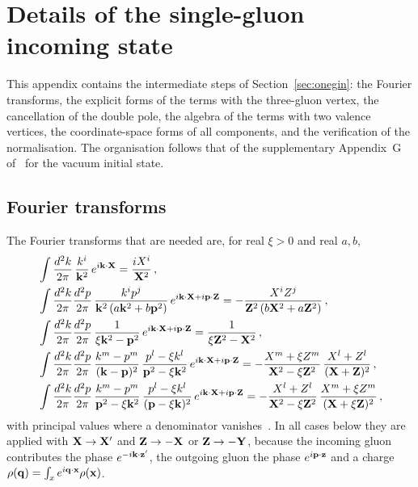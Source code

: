 \section{Details of the single-gluon incoming state}\label{app:onegluon}

This appendix contains the intermediate steps of Section~\ref{sec:onegin}: the Fourier transforms, the explicit forms of the terms with the three-gluon vertex, the cancellation of the double pole, the algebra of the terms with two valence vertices, the coordinate-space forms of all components, and the verification of the normalisation. The organisation follows that of the supplementary Appendix~G of~\cite{Lublinsky:2016meo} for the vacuum initial state.

\subsection{Fourier transforms}\label{app:fourier}

The Fourier transforms that are needed are, for real $\xi>0$ and real $a,b$,
\begin{align}
&\int\frac{d^2k}{2\pi}\,\frac{k^i}{\mathbf{k}^2}\,e^{i\mathbf{k}\cdot\mathbf{X}}=\frac{iX^i}{\mathbf{X}^2}\,,\label{eq:FT_K}\\
&\int\frac{d^2k}{2\pi}\frac{d^2p}{2\pi}\,\frac{k^ip^j}{\mathbf{k}^2\,(a\mathbf{k}^2+b\mathbf{p}^2)}\,e^{i\mathbf{k}\cdot\mathbf{X}+i\mathbf{p}\cdot\mathbf{Z}}=-\frac{X^iZ^j}{\mathbf{Z}^2\,(b\mathbf{X}^2+a\mathbf{Z}^2)}\,,\label{eq:FT_i2}\\
&\int\frac{d^2k}{2\pi}\frac{d^2p}{2\pi}\,\frac{1}{\xi\mathbf{k}^2-\mathbf{p}^2}\,e^{i\mathbf{k}\cdot\mathbf{X}+i\mathbf{p}\cdot\mathbf{Z}}=\frac{1}{\xi\mathbf{Z}^2-\mathbf{X}^2}\,,\label{eq:FT_i3}\\
&\int\frac{d^2k}{2\pi}\frac{d^2p}{2\pi}\,\frac{k^m-p^m}{(\mathbf{k}-\mathbf{p})^2}\,\frac{p^l-\xi k^l}{\mathbf{p}^2-\xi\mathbf{k}^2}\,e^{i\mathbf{k}\cdot\mathbf{X}+i\mathbf{p}\cdot\mathbf{Z}}=-\frac{X^m+\xi Z^m}{\mathbf{X}^2-\xi\mathbf{Z}^2}\,\frac{X^l+Z^l}{(\mathbf{X}+\mathbf{Z})^2}\,,\label{eq:FT_i4}\\
&\int\frac{d^2k}{2\pi}\frac{d^2p}{2\pi}\,\frac{k^m-p^m}{\mathbf{p}^2-\xi\mathbf{k}^2}\,\frac{p^l-\xi k^l}{(\mathbf{p}-\xi\mathbf{k})^2}\,e^{i\mathbf{k}\cdot\mathbf{X}+i\mathbf{p}\cdot\mathbf{Z}}=-\frac{X^l+Z^l}{\mathbf{X}^2-\xi\mathbf{Z}^2}\,\frac{X^m+\xi Z^m}{(\mathbf{X}+\xi\mathbf{Z})^2}\,,\label{eq:FT_i5}
\end{align}
with principal values where a denominator vanishes~\cite{Lublinsky:2016meo,Radhakrishnan:2026soft}. In all cases below they are applied with $\mathbf{X}\to\mathbf{X}'$ and $\mathbf{Z}\to-\mathbf{X}$ or $\mathbf{Z}\to-\mathbf{Y}$, because the incoming gluon contributes the phase $e^{-i\mathbf{k}\cdot\mathbf{z}'}$, the outgoing gluon the phase $e^{i\mathbf{p}\cdot\mathbf{z}}$ and a charge $\rho(\mathbf{q})=\int_xe^{i\mathbf{q}\cdot\mathbf{x}}\rho(\mathbf{x})$.

